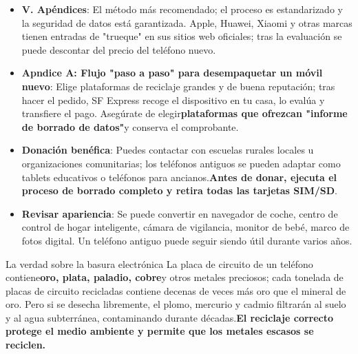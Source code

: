 \begin{itemize}
  \item \textbf{V. Apéndices}: El método más recomendado; el proceso es estandarizado y la seguridad de datos está garantizada. Apple, Huawei, Xiaomi y otras marcas tienen entradas de "trueque" en sus sitios web oficiales; tras la evaluación se puede descontar del precio del teléfono nuevo.
  \item \textbf{Apndice A: Flujo "paso a paso" para desempaquetar un móvil nuevo}: Elige plataformas de reciclaje grandes y de buena reputación; tras hacer el pedido, SF Express recoge el dispositivo en tu casa, lo evalúa y transfiere el pago. Asegúrate de elegir\textbf{plataformas que ofrezcan "informe de borrado de datos"}y conserva el comprobante.
  \item \textbf{Donación benéfica}: Puedes contactar con escuelas rurales locales u organizaciones comunitarias; los teléfonos antiguos se pueden adaptar como tablets educativos o teléfonos para ancianos.\textbf{Antes de donar, ejecuta el proceso de borrado completo y retira todas las tarjetas SIM/SD}.
  \item \textbf{Revisar apariencia}: Se puede convertir en navegador de coche, centro de control de hogar inteligente, cámara de vigilancia, monitor de bebé, marco de fotos digital. Un teléfono antiguo puede seguir siendo útil durante varios años.
\end{itemize}

\begin{tcbinfo}{La verdad sobre la basura electrónica}
La placa de circuito de un teléfono contiene\textbf{oro, plata, paladio, cobre}y otros metales preciosos; cada tonelada de placas de circuito recicladas contiene decenas de veces más oro que el mineral de oro. Pero si se desecha libremente, el plomo, mercurio y cadmio filtrarán al suelo y al agua subterránea, contaminando durante décadas.\textbf{El reciclaje correcto protege el medio ambiente y permite que los metales escasos se reciclen.}

\end{tcbinfo}

